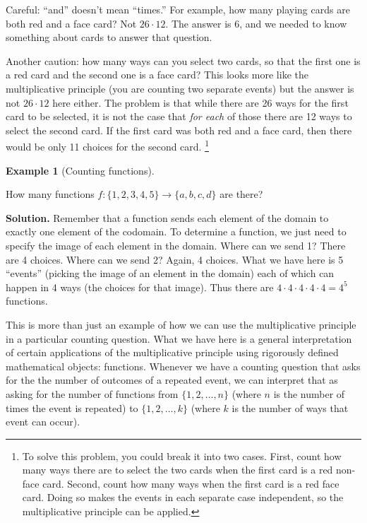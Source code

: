 \documentclass[10pt,]{book}
\theoremstyle{plain}
\theoremstyle{definition}
\newtheorem{example}[theorem]{Example}
\theoremstyle{definition}
\theoremstyle{definition}
\numberwithin{equation}{chapter}
\begin{document}
    Careful: ``and'' doesn't mean ``times.'' For example, how many playing cards are both red and a face card? Not \(26 \cdot 12\). The answer is 6, and we needed to know something about cards to answer that question.
\par

    Another caution: how many ways can you select two cards, so that the first one is a red card and the second one is a face card? This looks more like the multiplicative principle (you are counting two separate events) but the answer is not \(26 \cdot 12\) here either. The problem is that while there are 26 ways for the first card to be selected, it is not the case that \emph{for each} of those there are 12 ways to select the second card. If the first card was both red and a face card, then there would be only 11 choices for the second card.
    \footnote{To solve this problem, you could break it into two cases. First, count how many ways there are to select the two cards when the first card is a red non-face card. Second, count how many ways when the first card is a red face card. Doing so makes the events in each separate case independent, so the multiplicative principle can be applied.\label{fn-1}}
\begin{example}[Counting functions]\label{ex_counting-functions-all}

      How many functions \(f:\{1,2,3,4,5\} \to \{a,b,c,d\}\) are there?
    \par\medskip\noindent%
\textbf{Solution.}\quad
        Remember that a function sends each element of the domain to exactly one element of the codomain.  To determine a function, we just need to specify the image of each element in the domain.  Where can we send 1?  There are 4 choices.  Where can we send 2?  Again, 4 choices.  What we have here is 5 ``events'' (picking the image of an element in the domain) each of which can happen in 4 ways (the choices for that image).  Thus there are \(4 \cdot 4 \cdot 4 \cdot 4 \cdot 4 = 4^5\) functions.
\par

        This is more than just an example of how we can use the multiplicative principle in a particular counting question.  What we have here is a general interpretation of certain applications of the multiplicative principle using rigorously defined mathematical objects: functions.  Whenever we have a counting question that asks for the the number of outcomes of a repeated event, we can interpret that as asking for the number of functions from \(\{1,2,\ldots, n\}\) (where \(n\) is the number of times the event is repeated) to  \(\{1,2,\ldots,k\}\) (where \(k\) is the number of ways that event can occur).
\end{example}
\typeout{************************************************}
\typeout{************************************************}
\end{document}
